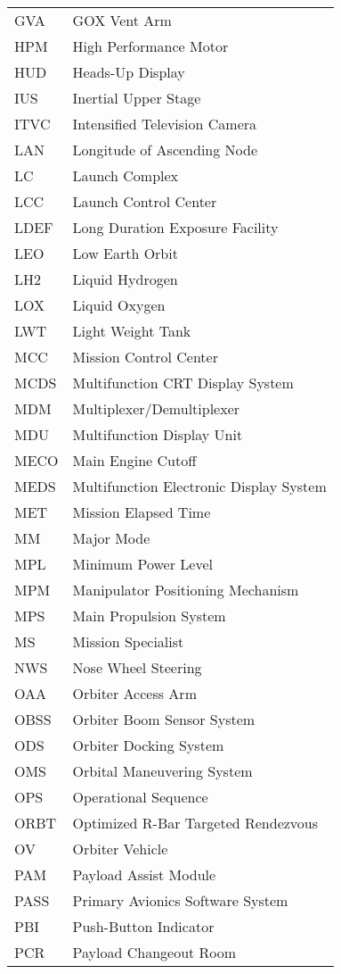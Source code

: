 \documentclass[Space_Shuttle_Vessel_Manual.tex]{subfiles}
\begin{document}
\begin{longtable}{l l }
GVA & GOX Vent Arm\\
HPM & High Performance Motor\\
HUD & Heads-Up Display\\
IUS & Inertial Upper Stage\\
ITVC & Intensified Television Camera\\
LAN & Longitude of Ascending Node\\
LC & Launch Complex\\
LCC & Launch Control Center\\
LDEF & Long Duration Exposure Facility\\
LEO & Low Earth Orbit\\
LH2 & Liquid Hydrogen\\
LOX & Liquid Oxygen\\
LWT & Light Weight Tank\\
MCC & Mission Control Center\\
MCDS & Multifunction CRT Display System\\
MDM & Multiplexer/Demultiplexer\\
MDU & Multifunction Display Unit\\
MECO & Main Engine Cutoff\\
MEDS & Multifunction Electronic Display System\\
MET & Mission Elapsed Time\\
MM & Major Mode\\
MPL & Minimum Power Level\\
MPM & Manipulator Positioning Mechanism\\
MPS & Main Propulsion System\\
MS & Mission Specialist\\
NWS & Nose Wheel Steering\\
OAA & Orbiter Access Arm\\
OBSS & Orbiter Boom Sensor System\\
ODS & Orbiter Docking System\\
OMS & Orbital Maneuvering System\\
OPS & Operational Sequence\\
ORBT & Optimized R-Bar Targeted Rendezvous\\
OV & Orbiter Vehicle\\
PAM & Payload Assist Module\\
PASS & Primary Avionics Software System\\
PBI & Push-Button Indicator\\
PCR & Payload Changeout Room\\

\end{longtable}
\end{document}
